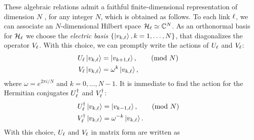 \begin{figure}[t]
\end{figure}


These algebraic relations admit a faithful finite-dimensional representation of dimension $N$ \cite{weyl1950theory}, for any integer $N$, which is obtained as follows.
To each link $\ell$, we can associate an $N$-dimensional Hilbert space $\mathcal{H}_\ell \simeq \mathbb{C}^N$.
As an orthonormal basis for $\mathcal{H}_\ell$ we choose the \emph{electric basis} $\{\ket{v_{k,\ell}}, k=1, \dots, N\}$, that diagonalizes the operator $V_\ell$.
With this choice, we can promptly write the actions of $U_\ell$ and $V_\ell$:
\begin{equation}
    \begin{split}
        U_\ell \ket{v_{k,\ell}} & = \ket{v_{k+1,\ell}}, \qquad \text{(mod $N$)} \\
        V_\ell \ket{v_{k,\ell}} & = \omega^k \ket{v_{k,\ell}},
    \end{split}
    \label{eq:elect_basis_op_action}
\end{equation}
where $\omega = e^{2 \pi i / N}$ and $k = 0, \dots, N-1$.
It is immediate to find the action for the Hermitian conjugates $U^{\dagger}_\ell$ and $V^{\dagger}_\ell$:
\begin{equation}
    \begin{split}
        U^\dagger_\ell \ket{v_{k,\ell}} & = \ket{v_{k-1,\ell}}, \qquad \text{(mod $N$)} \\
        V^\dagger_\ell \ket{v_{k,\ell}} & = \omega^{-k} \ket{v_{k,\ell}}.
    \end{split}
    \label{eq:elect_basis_op_action_hc}
\end{equation}
With this choice, $U_\ell$ and $V_\ell$ in matrix form are written as

